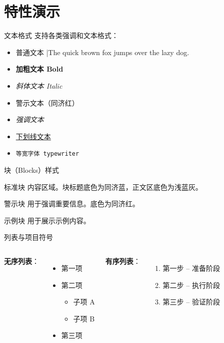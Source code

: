 \section{特性演示}

\begin{frame}{文本格式}
  支持各类强调和文本格式：
  \begin{itemize}
    \item 普通文本 \quad |\quad The quick brown fox jumps over the lazy dog.
    \item \textbf{加粗文本 Bold}
    \item \textit{斜体文本 Italic}
    \item \alert{警示文本（同济红）}
    \item \emph{强调文本}
    \item \uline{下划线文本}
    \item \texttt{等宽字体 typewriter}
  \end{itemize}
\end{frame}

\begin{frame}{块（Blocks）样式}
  \begin{block}{标准块}
    内容区域。块标题底色为同济蓝，正文区底色为浅蓝灰。
  \end{block}
  \begin{alertblock}{警示块}
    用于强调重要信息。底色为同济红。
  \end{alertblock}
  \begin{exampleblock}{示例块}
    用于展示示例内容。
  \end{exampleblock}
\end{frame}

\begin{frame}{列表与项目符号}
  \begin{columns}[T]
    \textbf{无序列表}：
    \begin{itemize}
      \item 第一项
      \item 第二项
        \begin{itemize}
          \item 子项 A
          \item 子项 B
        \end{itemize}
      \item 第三项
    \end{itemize}
    \textbf{有序列表}：
    \begin{enumerate}
      \item 第一步 -- 准备阶段
      \item 第二步 -- 执行阶段
      \item 第三步 -- 验证阶段
    \end{enumerate}
  \end{columns}
\end{frame}

